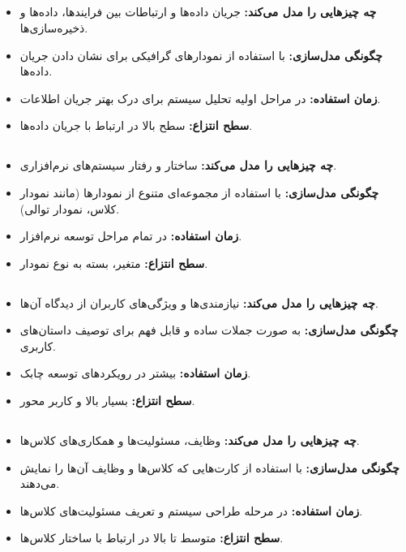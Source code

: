 \subsection*{}
\begin{itemize}
	\item \textbf{چه چیزهایی را مدل می‌کند:} جریان داده‌ها و ارتباطات بین فرایندها، داده‌ها و ذخیره‌سازی‌ها.
	\item \textbf{چگونگی مدل‌سازی:} با استفاده از نمودارهای گرافیکی برای نشان دادن جریان داده‌ها.
	\item \textbf{زمان استفاده:} در مراحل اولیه تحلیل سیستم برای درک بهتر جریان اطلاعات.
	\item \textbf{سطح انتزاع:} سطح بالا در ارتباط با جریان داده‌ها.
\end{itemize}

\subsection*{}
\begin{itemize}
	\item \textbf{چه چیزهایی را مدل می‌کند:} ساختار و رفتار سیستم‌های نرم‌افزاری.
	\item \textbf{چگونگی مدل‌سازی:} با استفاده از مجموعه‌ای متنوع از نمودارها (مانند نمودار کلاس، نمودار توالی).
	\item \textbf{زمان استفاده:} در تمام مراحل توسعه نرم‌افزار.
	\item \textbf{سطح انتزاع:} متغیر، بسته به نوع نمودار.
\end{itemize}

\subsection*{}
\begin{itemize}
	\item \textbf{چه چیزهایی را مدل می‌کند:} نیازمندی‌ها و ویژگی‌های کاربران از دیدگاه آن‌ها.
	\item \textbf{چگونگی مدل‌سازی:} به صورت جملات ساده و قابل فهم برای توصیف داستان‌های کاربری.
	\item \textbf{زمان استفاده:} بیشتر در رویکردهای توسعه چابک.
	\item \textbf{سطح انتزاع:} بسیار بالا و کاربر محور.
\end{itemize}

\subsection*{}
\begin{itemize}
	\item \textbf{چه چیزهایی را مدل می‌کند:} وظایف، مسئولیت‌ها و همکاری‌های کلاس‌ها.
	\item \textbf{چگونگی مدل‌سازی:} با استفاده از کارت‌هایی که کلاس‌ها و وظایف آن‌ها را نمایش می‌دهند.
	\item \textbf{زمان استفاده:} در مرحله طراحی سیستم و تعریف مسئولیت‌های کلاس‌ها.
	\item \textbf{سطح انتزاع:} متوسط تا بالا در ارتباط با ساختار کلاس‌ها.
\end{itemize}

